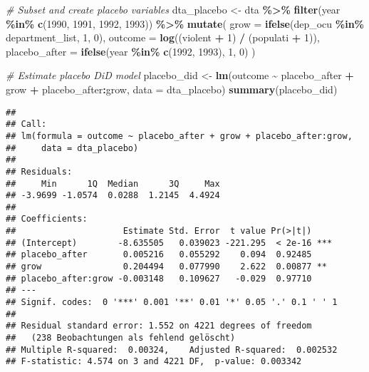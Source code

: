 \documentclass[
]{article}
\newenvironment{Shaded}{\begin{snugshade}}{\end{snugshade}}
\newcommand{\AttributeTok}[1]{\textcolor[rgb]{0.13,0.29,0.53}{#1}}
\newcommand{\CommentTok}[1]{\textcolor[rgb]{0.56,0.35,0.01}{\textit{#1}}}
\newcommand{\DecValTok}[1]{\textcolor[rgb]{0.00,0.00,0.81}{#1}}
\newcommand{\FunctionTok}[1]{\textcolor[rgb]{0.13,0.29,0.53}{\textbf{#1}}}
\newcommand{\NormalTok}[1]{#1}
\newcommand{\OtherTok}[1]{\textcolor[rgb]{0.56,0.35,0.01}{#1}}
\newcommand{\SpecialCharTok}[1]{\textcolor[rgb]{0.81,0.36,0.00}{\textbf{#1}}}
\begin{document}
\begin{Shaded}
\begin{Highlighting}[]
\CommentTok{\# Subset and create placebo variables}
\NormalTok{dta\_placebo }\OtherTok{\textless{}{-}}\NormalTok{ dta }\SpecialCharTok{\%\textgreater{}\%}
  \FunctionTok{filter}\NormalTok{(year }\SpecialCharTok{\%in\%} \FunctionTok{c}\NormalTok{(}\DecValTok{1990}\NormalTok{, }\DecValTok{1991}\NormalTok{, }\DecValTok{1992}\NormalTok{, }\DecValTok{1993}\NormalTok{)) }\SpecialCharTok{\%\textgreater{}\%}
  \FunctionTok{mutate}\NormalTok{(}
    \AttributeTok{grow =} \FunctionTok{ifelse}\NormalTok{(dep\_ocu }\SpecialCharTok{\%in\%}\NormalTok{ department\_list, }\DecValTok{1}\NormalTok{, }\DecValTok{0}\NormalTok{),}
    \AttributeTok{outcome =} \FunctionTok{log}\NormalTok{((violent }\SpecialCharTok{+} \DecValTok{1}\NormalTok{) }\SpecialCharTok{/}\NormalTok{ (populati }\SpecialCharTok{+} \DecValTok{1}\NormalTok{)),}
    \AttributeTok{placebo\_after =} \FunctionTok{ifelse}\NormalTok{(year }\SpecialCharTok{\%in\%} \FunctionTok{c}\NormalTok{(}\DecValTok{1992}\NormalTok{, }\DecValTok{1993}\NormalTok{), }\DecValTok{1}\NormalTok{, }\DecValTok{0}\NormalTok{)}
\NormalTok{  )}
\end{Highlighting}
\end{Shaded}

\begin{Shaded}
\begin{Highlighting}[]
\CommentTok{\# Estimate placebo DiD model}
\NormalTok{placebo\_did }\OtherTok{\textless{}{-}} \FunctionTok{lm}\NormalTok{(outcome }\SpecialCharTok{\textasciitilde{}}\NormalTok{ placebo\_after }\SpecialCharTok{+}\NormalTok{ grow }\SpecialCharTok{+}\NormalTok{ placebo\_after}\SpecialCharTok{:}\NormalTok{grow, }\AttributeTok{data =}\NormalTok{ dta\_placebo)}
\FunctionTok{summary}\NormalTok{(placebo\_did)}
\end{Highlighting}
\end{Shaded}

\begin{verbatim}
## 
## Call:
## lm(formula = outcome ~ placebo_after + grow + placebo_after:grow, 
##     data = dta_placebo)
## 
## Residuals:
##     Min      1Q  Median      3Q     Max 
## -3.9699 -1.0574  0.0288  1.2145  4.4924 
## 
## Coefficients:
##                     Estimate Std. Error  t value Pr(>|t|)    
## (Intercept)        -8.635505   0.039023 -221.295  < 2e-16 ***
## placebo_after       0.005216   0.055292    0.094  0.92485    
## grow                0.204494   0.077990    2.622  0.00877 ** 
## placebo_after:grow -0.003148   0.109627   -0.029  0.97710    
## ---
## Signif. codes:  0 '***' 0.001 '**' 0.01 '*' 0.05 '.' 0.1 ' ' 1
## 
## Residual standard error: 1.552 on 4221 degrees of freedom
##   (238 Beobachtungen als fehlend gelöscht)
## Multiple R-squared:  0.00324,    Adjusted R-squared:  0.002532 
## F-statistic: 4.574 on 3 and 4221 DF,  p-value: 0.003342
\end{verbatim}
\end{document}
